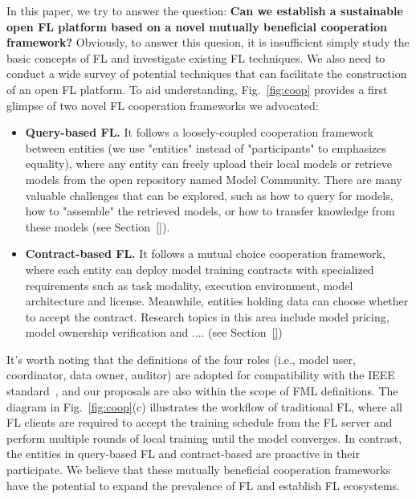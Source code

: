 In this paper, we try to answer the question: \textbf{Can we establish a sustainable open FL platform based on a novel mutually beneficial cooperation framework?}
Obviously, to answer this quesion, it is insufficient simply study the basic concepts of FL and investigate existing FL techniques.
We also need to conduct a wide survey of potential techniques that can facilitate the construction of an open FL platform.
To aid understanding, Fig.~\ref{fig:coop} provides a first glimpse of two novel FL cooperation frameworks we advocated: 
\begin{itemize}
    \item \textbf{Query-based FL.} It follows a loosely-coupled cooperation framework between entities (we use "entities" instead of "participants" to emphasizes equality), where any entity can freely upload their local models or retrieve models from the open repository named Model Community.
    There are many valuable challenges that can be explored, such as how to query for models, how to "assemble" the retrieved models, or how to transfer knowledge from these models (see Section~\ref{}). %
    \item \textbf{Contract-based FL.} It follows a mutual choice cooperation framework, where each entity can deploy model training contracts with specialized requirements such as task modality, execution environment, model architecture and license. Meanwhile, entities holding data can choose whether to accept the contract.
    Research topics in this area include model pricing, model ownership verification and .... (see Section~\ref{}) %
\end{itemize}
It's worth noting that the definitions of the four roles (i.e., model user, coordinator, data owner, auditor) are adopted for compatibility with the IEEE standard~\cite{IEEEstd3652}, and our proposals are also within the scope of FML definitions. 
The diagram in Fig.~\ref{fig:coop}(c) illustrates the workflow of traditional FL, where all FL clients are required to accept the training schedule from the FL server and perform multiple rounds of local training until the model converges.
In contrast, the entities in query-based FL and contract-based are proactive in their participate.
We believe that these mutually beneficial cooperation frameworks have the potential to expand the prevalence of FL and establish FL ecosystems.

